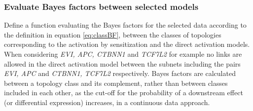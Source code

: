 \documentclass[a4paper]{article}
\begin{document}
\subsubsection*{Evaluate Bayes factors between selected models}
Define a function evaluating the Bayes factors for the selected data according to the definition in equation \eqref{eq:classBF}, between the classes of topologies corresponding to the activation by sensitization and the direct activation models. When considering \emph{EVI, APC, CTBNN1} and \emph{TCF7L2} for example no links are allowed in the direct activation model between the subnets including the pairs \emph{EVI, APC} and \emph{CTBNN1, TCF7L2} respectively.
Bayes factors are calculated between a topology class and its complement, rather than between classes included in each other, as the cut-off for the probability of a downstream effect (or differential expression) increases, in a continuous data approach.
\end{document}
